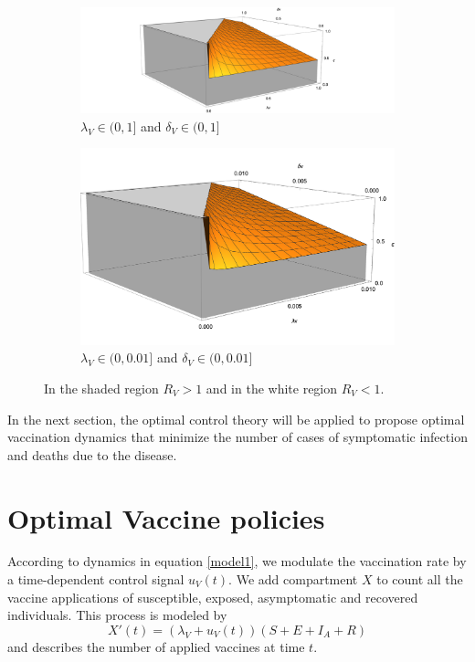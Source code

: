 \documentclass[preprint, sort&compress]{elsarticle}
\begin{document}
\begin{figure}[h!]
\centering
\begin{subfigure}[b]{0.6\linewidth}
\includegraphics[width=\linewidth]{R0-3D-A.png}
\caption{$\lambda_V\in(0,1]$ and $\delta_V\in(0,1]$}
\label{figure4A}
\end{subfigure}
\begin{subfigure}[b]{0.35\linewidth}
\includegraphics[width=\linewidth]{R0-3D-B.png}
\caption{$\lambda_V\in(0,0.01]$ and $\delta_V\in(0,0.01]$}
\label{figure4}
\end{subfigure}
\caption{In the shaded region $ R_V> 1 $ and in the white region $ R_V <1 $.}
\label{figure4B}
\end{figure}

In the next section, the optimal control theory will be applied to propose optimal vaccination dynamics that minimize the number of cases of symptomatic infection and deaths due to the disease. 	\section{Optimal Vaccine policies}
		  According to dynamics in equation \eqref{model1}, we modulate the vaccination rate by 
a time-dependent control signal  $u_V(t)$. We add  compartment $X$ to count all the vaccine
applications of susceptible, exposed, asymptomatic and
recovered individuals. This process is modeled by
\begin{equation}
    \label{eqn:counter}
      X'(t) =
        (\lambda_V + u_V(t))(S + E + I_A + R)
\end{equation}
and describes the number of applied vaccines at time $t$.
 
\end{document}
